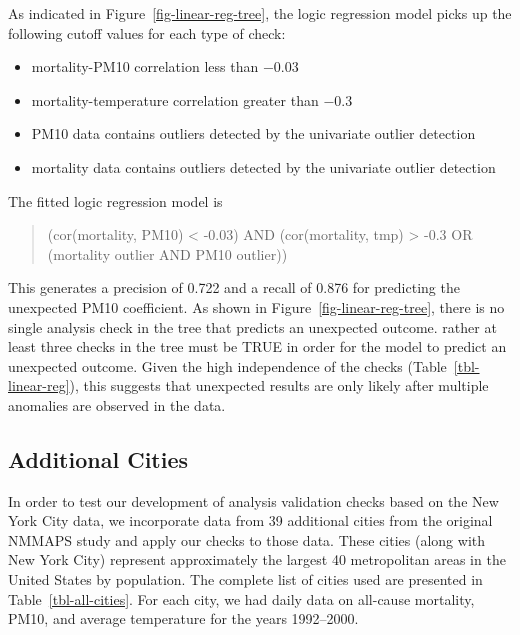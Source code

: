 \documentclass[
  12pt,
]{interact}
\providecommand{\tightlist}{%
  \setlength{\itemsep}{0pt}\setlength{\parskip}{0pt}}\usepackage{longtable,booktabs,array}
\begin{document}
As indicated in Figure~\ref{fig-linear-reg-tree}, the logic regression
model picks up the following cutoff values for each type of check:

\begin{itemize}
\tightlist
\item
  mortality-PM10 correlation less than \(-0.03\)
\item
  mortality-temperature correlation greater than \(-0.3\)
\item
  PM10 data contains outliers detected by the univariate outlier
  detection
\item
  mortality data contains outliers detected by the univariate outlier
  detection
\end{itemize}

The fitted logic regression model is

\begin{quote}
(cor(mortality, PM10) \textless{} -0.03) AND (cor(mortality, tmp)
\textgreater{} -0.3 OR (mortality outlier AND PM10 outlier))
\end{quote}

This generates a precision of 0.722 and a recall of 0.876 for predicting
the unexpected PM10 coefficient. As shown in
Figure~\ref{fig-linear-reg-tree}, there is no single analysis check in
the tree that predicts an unexpected outcome. rather at least three
checks in the tree must be TRUE in order for the model to predict an
unexpected outcome. Given the high independence of the checks
(Table~\ref{tbl-linear-reg}), this suggests that unexpected results are
only likely after multiple anomalies are observed in the data.

\subsection{Additional Cities}\label{additional-cities}

In order to test our development of analysis validation checks based on
the New York City data, we incorporate data from 39 additional cities
from the original NMMAPS study and apply our checks to those data. These
cities (along with New York City) represent approximately the largest 40
metropolitan areas in the United States by population. The complete list
of cities used are presented in Table~\ref{tbl-all-cities}. For each
city, we had daily data on all-cause mortality, PM10, and average
temperature for the years 1992--2000.
\end{document}
